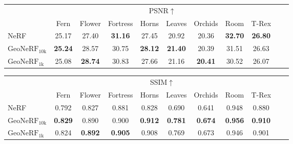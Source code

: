 \begin{table}[!t]
    \begin{center}
        \begin{threeparttable}
            \begin{tabular}{l|cccccccccc}
            & \multicolumn{8}{c}{PSNR$\uparrow$} \\
            &  Fern & Flower & Fortress & Horns & Leaves & Orchids & Room & T-Rex \\
            \hline
            NeRF & 25.17 & 27.40 & \textbf{31.16} & 27.45 & 20.92 & 20.36 & \textbf{32.70} & \textbf{26.80} \\
            $\text{GeoNeRF}_{\text{10k}}$ & \textbf{25.24} & 28.57 & 30.75 & \textbf{28.12} & \textbf{21.40} & 20.39 & 31.51 & 26.63 \\
            $\text{GeoNeRF}_{\text{1k}}$ & 25.08 & \textbf{28.74} & 30.83 & 27.66 & 21.16 & \textbf{20.41} & 30.52 & 26.07\\            
            \hline
            \end{tabular}
        \end{threeparttable}
    \end{center}

    \vspace{1.0ex}
    
    \begin{center}
        \begin{threeparttable}
            \begin{tabular}{l|cccccccccc}
            & \multicolumn{8}{c}{SSIM$\uparrow$} \\
            &  Fern & Flower & Fortress & Horns & Leaves & Orchids & Room & T-Rex \\
            \hline
            NeRF & 0.792 & 0.827 & 0.881 & 0.828 & 0.690 & 0.641 & 0.948 & 0.880 \\
            $\text{GeoNeRF}_{\text{10k}}$ & \textbf{0.829} & 0.890 & 0.900 & \textbf{0.912} & \textbf{0.781} & \textbf{0.674} & \textbf{0.956} & \textbf{0.910} \\
            $\text{GeoNeRF}_{\text{1k}}$ & 0.824 & \textbf{0.892} & \textbf{0.905} & 0.908 & 0.769 & 0.673 & 0.946 & 0.901 \\            
            \hline
            \end{tabular}
        \end{threeparttable}
    \end{center}
    
    \vspace{1.0ex}


\end{table}
